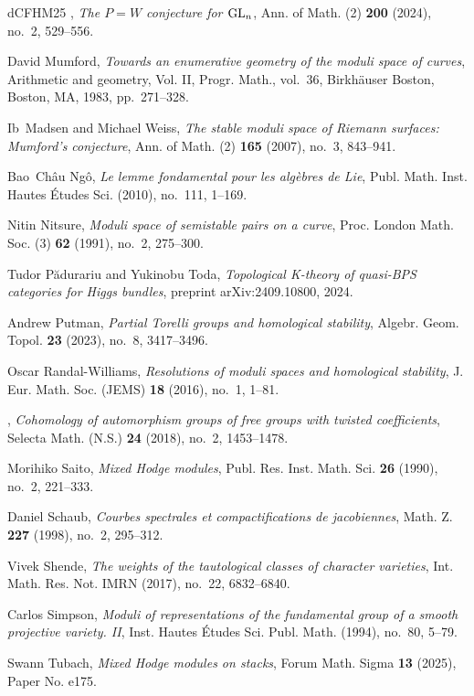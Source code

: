\documentclass[11pt,reqno]{amsart}
\theoremstyle{plain} %
\theoremstyle{definition}
\begin{document}
\begin{thebibliography}{dCFHM25}
\bysame, \emph{The {$P=W$} conjecture for {${\rm GL}_n$}}, Ann. of Math. (2)
  \textbf{200} (2024), no.~2, 529--556. 

David Mumford, \emph{Towards an enumerative geometry of the moduli space of
  curves}, Arithmetic and geometry, {V}ol. {II}, Progr. Math., vol.~36,
  Birkh\"auser Boston, Boston, MA, 1983, pp.~271--328. 

Ib~Madsen and Michael Weiss, \emph{The stable moduli space of {R}iemann
  surfaces: {M}umford's conjecture}, Ann. of Math. (2) \textbf{165} (2007),
  no.~3, 843--941. 

Bao~Ch\^au Ng{\^o}, \emph{Le lemme fondamental pour les alg\`ebres de {L}ie},
  Publ. Math. Inst. Hautes \'Etudes Sci. (2010), no.~111, 1--169. 

Nitin Nitsure, \emph{Moduli space of semistable pairs on a curve}, Proc. London
  Math. Soc. (3) \textbf{62} (1991), no.~2, 275--300. 

Tudor Pădurariu and Yukinobu Toda, \emph{Topological {K}-theory of quasi-{BPS}
  categories for {H}iggs bundles}, preprint arXiv:2409.10800, 2024.

Andrew Putman, \emph{Partial {T}orelli groups and homological stability},
  Algebr. Geom. Topol. \textbf{23} (2023), no.~8, 3417--3496. 

Oscar Randal-Williams, \emph{Resolutions of moduli spaces and homological
  stability}, J. Eur. Math. Soc. (JEMS) \textbf{18} (2016), no.~1, 1--81.

\bysame, \emph{Cohomology of automorphism groups of free groups with twisted
  coefficients}, Selecta Math. (N.S.) \textbf{24} (2018), no.~2, 1453--1478.

Morihiko Saito, \emph{Mixed {H}odge modules}, Publ. Res. Inst. Math. Sci.
  \textbf{26} (1990), no.~2, 221--333. 

Daniel Schaub, \emph{Courbes spectrales et compactifications de jacobiennes},
  Math. Z. \textbf{227} (1998), no.~2, 295--312. 

Vivek Shende, \emph{The weights of the tautological classes of character
  varieties}, Int. Math. Res. Not. IMRN (2017), no.~22, 6832--6840.

Carlos Simpson, \emph{Moduli of representations of the fundamental group of a
  smooth projective variety. {II}}, Inst. Hautes \'Etudes Sci. Publ. Math.
  (1994), no.~80, 5--79. 

Swann Tubach, \emph{Mixed {H}odge modules on stacks}, Forum Math. Sigma
  \textbf{13} (2025), Paper No. e175.

\end{thebibliography}
\end{document}
